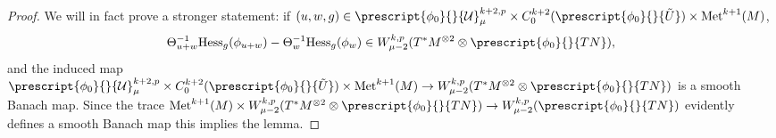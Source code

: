 \documentclass{article}
\numberwithin{equation}{section}        %
\theoremstyle{bfnote}
\theoremstyle{definition}
\theoremstyle{bfremark}
\newcommand{\Met}{\mathrm{Met}}             %
\begin{document}
\begin{proof}
    We will in fact prove a stronger statement: if $(u,w,g) \in \prescript{\phi_0}{}{\mathcal{U}}^{k+2,p}_\mu \times C^{k+2}_0(\prescript{\phi_0}{}{\tilde{U}}) \times \Met^{k+1}(M)$,
    \begin{equation*}
        \Theta_{u+w}^{-1} \mathrm{Hess}_g(\phi_{u+w}) - \Theta_w^{-1} \mathrm{Hess}_g(\phi_w) \in W^{k,p}_{\mu-2}(T^*M^{\otimes 2} \otimes \prescript{\phi_0}{}{TN}),
    \end{equation*}
    and the induced map $\prescript{\phi_0}{}{\mathcal{U}}^{k+2,p}_\mu \times C^{k+2}_0(\prescript{\phi_0}{}{\tilde{U}}) \times \Met^{k+1}(M) \to W^{k,p}_{\mu-2}(T^*M^{\otimes 2} \otimes \prescript{\phi_0}{}{TN})$ is a smooth Banach map. Since the trace $\Met^{k+1}(M) \times W^{k,p}_{\mu-2}(T^*M^{\otimes 2} \otimes \prescript{\phi_0}{}{TN}) \to W^{k,p}_{\mu-2}(\prescript{\phi_0}{}{TN})$ evidently defines a smooth Banach map this implies the lemma.
    

\end{proof}
\end{document}
